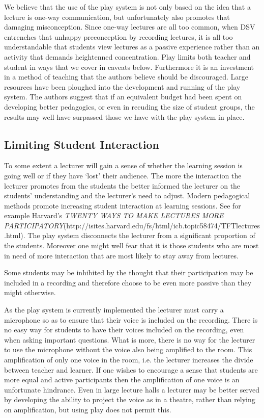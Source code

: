\documentclass[a4paper,10pt]{article}
\begin{document}
We believe that the use of the play system is not only based on the idea that a lecture is one-way communication, but unfortunately also promotes that damaging misconception. Since one-way lectures are all too common, when DSV entrenches that unhappy preconception by recording lectures, it is all too understandable that students view lectures as a passive experience rather than an activity that demands heightenned concentration. Play limits both teacher and student in ways that we cover in caveats below. Furthermore it is an investment in a method of teaching that the authors believe should be discouraged. Large resources have been ploughed into the development and running of the play system. The authors suggest that if an equivalent budget had been spent on developing better pedagogics, or even in recuding the size of student groups, the results may well have surpassed those we have with the play system in place.


\subsection{Limiting Student Interaction}
To some extent a lecturer will gain a sense of whether the learning session is going well or if they have `lost' their audience. The more the interaction the lecturer promotes from the students the better informed the lecturer on the students' understanding and the lecturer's need to adjust. Modern pedagogical methods promote increasing student interaction at learning sessions. See for example Harvard's \emph{TWENTY WAYS TO MAKE LECTURES MORE PARTICIPATORY}(http://isites.harvard.edu/fs/html/icb.topic58474/TFTlectures.html). The play system disconnects the lecturer from a significant proportion of the students. Moreover one might well fear that it is those students who are most in need of more interaction that are most likely to stay away from lectures.

Some students may be inhibited by the thought that their participation may be included in a recording and therefore choose to be even more passive than they might otherwise. 

As the play system is currently implemented the lecturer must carry a microphone so as to ensure that their voice is included on the recording. There is no easy way for students to have their voices included on the recording, even when asking important questions. What is more, there is no way for the lecturer to use the microphone without the voice also being amplified to the room. This amplification of only one voice in the room, i.e. the lecturer increases the divide between teacher and learner. If one wishes to encourage a sense that students are more equal and active participants then the amplification of one voice is an unfortunate hindrance. Even in large lecture halls a lecturer may be better served by developing the ability to project the voice as in a theatre, rather than relying on amplification, but using play does not permit this.
\end{document}
